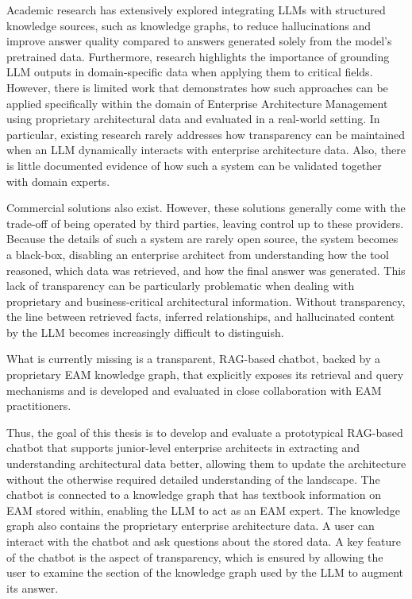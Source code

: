 Academic research has extensively explored integrating LLMs with structured knowledge sources, such as knowledge graphs, to reduce hallucinations and improve answer quality compared to answers generated solely from the model's pretrained data. Furthermore, research highlights the importance of grounding LLM outputs in domain-specific data when applying them to critical fields. \cite{lewis2020retrieval, sharma2025reducing} However, there is limited work that demonstrates how such approaches can be applied specifically within the domain of Enterprise Architecture Management using proprietary architectural data and evaluated in a real-world setting. In particular, existing research rarely addresses how transparency can be maintained when an LLM dynamically interacts with enterprise architecture data. Also, there is little documented evidence of how such a system can be validated together with domain experts.

Commercial solutions also exist. However, these solutions generally come with the trade-off of being operated by third parties, leaving control up to these providers. Because the details of such a system are rarely open source, the system becomes a black-box, disabling an enterprise architect from understanding how the tool reasoned, which data was retrieved, and how the final answer was generated. This lack of transparency can be particularly problematic when dealing with proprietary and business-critical architectural information. Without transparency, the line between retrieved facts, inferred relationships, and hallucinated content by the LLM becomes increasingly difficult to distinguish.

What is currently missing is a transparent, RAG-based chatbot, backed by a proprietary EAM knowledge graph, that explicitly exposes its retrieval and query mechanisms and is developed and evaluated in close collaboration with EAM practitioners.

Thus, the goal of this thesis is to develop and evaluate a prototypical RAG-based chatbot that supports junior-level enterprise architects in extracting and understanding architectural data better, allowing them to update the architecture without the otherwise required detailed understanding of the landscape. The chatbot is connected to a knowledge graph that has textbook information on EAM stored within, enabling the LLM to act as an EAM expert. The knowledge graph also contains the proprietary enterprise architecture data. A user can interact with the chatbot and ask questions about the stored data. A key feature of the chatbot is the aspect of transparency, which is ensured by allowing the user to examine the section of the knowledge graph used by the LLM to augment its answer.

